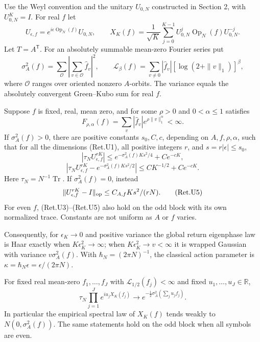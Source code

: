 Use the Weyl convention and the unitary \(U_{0,N}\) constructed in Section 2,
with \(U_{0,N}^K=I\). For real \(f\) let
\[
 U_{\epsilon,f}=e^{i\epsilon\operatorname{Op}_N(f)}U_{0,N},
 \qquad
 X_K(f)=\frac1{\sqrt K}\sum_{j=0}^{K-1}
              U_{0,N}^j\operatorname{Op}_N(f)U_{0,N}^{-j}.
\]
Let \(T=A^{\mathsf T}\). For an absolutely summable mean-zero Fourier
series put
\[
 \sigma_A^2(f)=\sum_{\mathcal O}
                   \left|\sum_{v\in\mathcal O}\widehat f_v\right|^2,
 \qquad
 \mathcal L_\beta(f)=\sum_{v\ne0}
               |\widehat f_v|[\log(2+\|v\|_1)]^\beta,       \tag{Ret.U2}
\]
where \(\mathcal O\) ranges over oriented nonzero \(A\)-orbits.
The variance equals the absolutely convergent Green--Kubo sum for
real \(f\).

\begin{theorem}\label{pass1:return_general-1} Suppose \(f\) is fixed, real, mean zero,
and for some \(\rho>0\) and \(0<\alpha\le1\) satisfies
\[
             F_{\rho,\alpha}(f)=\sum_v|\widehat f_v|
                          e^{\rho\|v\|_1^\alpha}<\infty .
\]
If \(\sigma_A^2(f)>0\), there are positive constants
\(s_0,C,c\), depending on \(A,f,\rho,\alpha\), such that for all the dimensions (Ret.U1),
all positive integers \(r\), and \(s=r|\epsilon|\le s_0\),
\[
 |\tau_N U_{\epsilon,f}^{rK}|
             \le e^{-\sigma_A^2(f)Ks^2/4}+Ce^{-cK},        \tag{Ret.U3}
\]
\[
 |\tau_N U_{\epsilon,f}^{rK}
                   -e^{-\sigma_A^2(f)Ks^2/2}|
             \le C K^{-1/2}+Ce^{-cK}.                    \tag{Ret.U4}
\]
Here \(\tau_N=N^{-1}\operatorname{Tr}\).
If \(\sigma_A^2(f)=0\), instead
\[
             \|U_{\epsilon,f}^{rK}-I\|_{\rm op}
                           \le C_{A,f}Ks^2/(rN).         \tag{Ret.U5}
\]
For even \(f\), (Ret.U3)--(Ret.U5) also hold on the odd block with its own
normalized trace. Constants are not uniform as \(A\) or \(f\) varies.
\end{theorem}

Consequently, for \(\epsilon_K\to0\) and positive variance the global
return eigenphase law is Haar exactly when \(K\epsilon_K^2\to\infty\);
when \(K\epsilon_K^2\to v<\infty\) it is wrapped Gaussian with variance
\(v\sigma_A^2(f)\). With \(\hbar_N=(2\pi N)^{-1}\), the classical action
parameter is \(\kappa=\hbar_N\epsilon=\epsilon/(2\pi N)\).

\begin{theorem}\label{pass1:return_general-2} For fixed real mean-zero
\(f_1,\ldots,f_J\) with \(\mathcal L_{1/2}(f_j)<\infty\) and fixed
\(u_1,\ldots,u_J\in\mathbb R\),
\[
 \tau_N\prod_{j=1}^J e^{iu_jX_K(f_j)}
       \longrightarrow
       e^{-\frac12\sigma_A^2(\sum_j u_j f_j)}.             \tag{Ret.U6}
\]
In particular the empirical spectral law of \(X_K(f)\) tends weakly
to \(N(0,\sigma_A^2(f))\). The same statements hold on the odd block
when all symbols are even.
\end{theorem}

